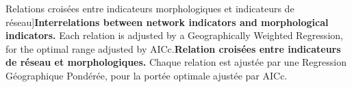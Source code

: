 

\begin{table}
\caption[Interrelations between morphological indicators and network indicators][Relations croisées entre indicateurs morphologiques et indicateurs de réseau]{\textbf{Interrelations between network indicators and morphological indicators.} Each relation is adjusted by a Geographically Weighted Regression, for the optimal range adjusted by AICc.\label{tab:staticcorrelations:gwr}}{\textbf{Relation croisées entre indicateurs de réseau et morphologiques.} Chaque relation est ajustée par une Regression Géographique Pondérée, pour la portée optimale ajustée par AICc.\label{tab:staticcorrelations:gwr}}
\end{table}
